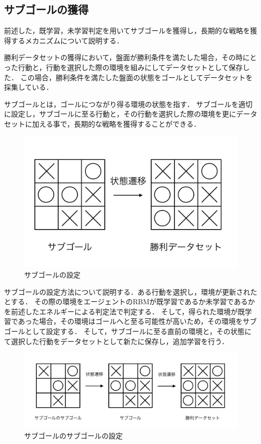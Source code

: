 \subsection{サブゴールの獲得}
前述した，既学習，未学習判定を用いてサブゴールを獲得し，長期的な戦略を獲得するメカニズムについて説明する．

勝利データセットの獲得において，盤面が勝利条件を満たした場合，その時にとった行動と，行動を選択した際の環境を組みにしてデータセットとして保存した．
この場合，勝利条件を満たした盤面の状態をゴールとしてデータセットを採集している．

サブゴールとは，ゴールにつながり得る環境の状態を指す．
サブゴールを適切に設定し，サブゴールに至る行動と，その行動を選択した際の環境を更にデータセットに加える事で，長期的な戦略を獲得することができる．

\begin{figure}[tb]
 \begin{center}
  \includegraphics[scale=0.4]{./koki/sg.png}
   \caption{サブゴールの設定}
  \label{fig:sg}
 \end{center}
\end{figure}


サブゴールの設定方法について説明する．ある行動を選択し，環境が更新されたとする．
その際の環境をエージェントのRBMが既学習であるか未学習であるかを前述したエネルギーによる判定法で判定する．
そして，得られた環境が既学習であった場合，その環境はゴールへと至る可能性が高いため，その環境をサブゴールとして設定する．
そして，サブゴールに至る直前の環境と，その状態にて選択した行動をデータセットとして新たに保存し，追加学習を行う．

\begin{figure}[tb]
 \begin{center}
  \includegraphics[scale=0.5]{./koki/sgsg.png}
   \caption{サブゴールのサブゴールの設定}
  \label{fig:sgsg}
 \end{center}
\end{figure}


